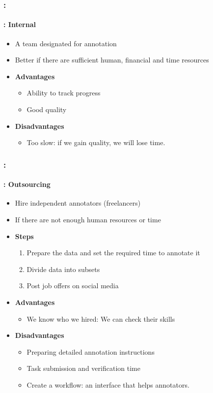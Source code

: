 \documentclass[xcolor=table]{beamer}
\begin{document}
\begin{frame}
	\frametitle{\insertshortsubtitle: \insertsection}
	\framesubtitle{\insertsubsection: Internal}
	
	\begin{itemize}
		\item A team designated for annotation
		\item Better if there are sufficient human, financial and time resources
		\item \textbf{Advantages}
		\begin{itemize}
			\item Ability to track progress
			\item Good quality
		\end{itemize}
		\item \textbf{Disadvantages}
		\begin{itemize}
			\item Too slow: if we gain quality, we will lose time.
		\end{itemize}
	\end{itemize}

\end{frame}

\begin{frame}
	\frametitle{\insertshortsubtitle: \insertsection}
	\framesubtitle{\insertsubsection: Outsourcing}
	
	\begin{itemize}
		\item Hire independent annotators (freelancers)
		\item If there are not enough human resources or time
		\item \textbf{Steps}
		\begin{enumerate}
			\item Prepare the data and set the required time to annotate it
			\item Divide data into subsets
			\item Post job offers on social media
		\end{enumerate}
		\item \textbf{Advantages}
		\begin{itemize}
			\item We know who we hired: We can check their skills
		\end{itemize}
		\item \textbf{Disadvantages}
		\begin{itemize}
			\item Preparing detailed annotation instructions
			\item Task submission and verification time
			\item Create a workflow: an interface that helps annotators.
		\end{itemize}
	\end{itemize}

\end{frame}
\end{document}
